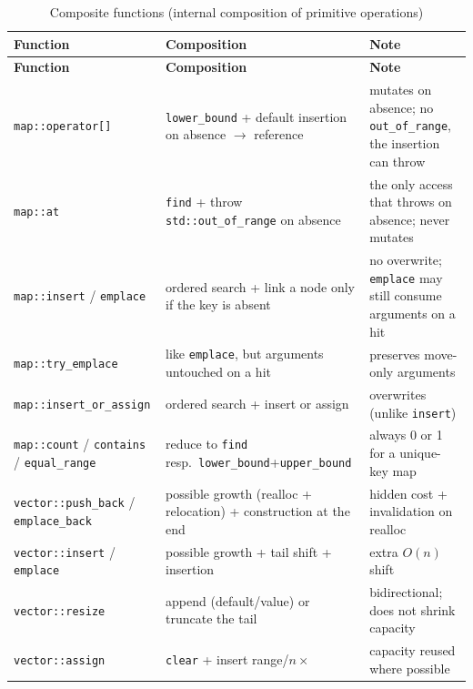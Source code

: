 \begin{longtable}{@{}>{\raggedright\arraybackslash}p{3.3cm} >{\raggedright\arraybackslash}p{5.6cm} >{\raggedright\arraybackslash}p{3.1cm}@{}}
  \caption{Composite functions (internal composition of primitive operations)}\label{tab:if-decomp}\\
  \toprule
  \textbf{Function} & \textbf{Composition} & \textbf{Note} \\
  \midrule
\endfirsthead%
  \toprule
  \textbf{Function} & \textbf{Composition} & \textbf{Note} \\
  \midrule
\endhead%
  \texttt{map::}\allowbreak\texttt{operator[]} & \texttt{lower\_bound} + default insertion on absence $\to$ reference & mutates on absence; no \texttt{out\_of\_range}, the insertion can throw \\
  \texttt{map::at} & \texttt{find} + throw \texttt{std::out\_of\_range} on absence & the only access that throws on absence; never mutates \\
  \texttt{map::insert} / \texttt{emplace} & ordered search + link a node only if the key is absent & no overwrite; \texttt{emplace} may still consume arguments on a hit \\
  \texttt{map::try\_\allowbreak{}emplace} & like \texttt{emplace}, but arguments untouched on a hit & preserves move-only arguments \\
  \texttt{map::insert\_\allowbreak{}or\_\allowbreak{}assign} & ordered search + insert or assign & overwrites (unlike \texttt{insert}) \\
  \texttt{map::count} / \texttt{contains} / \texttt{equal\_range} & reduce to \texttt{find} resp.\ \texttt{lower\_bound}+\texttt{upper\_bound} & always 0 or 1 for a unique-key map \\
  \texttt{vector::}\allowbreak\texttt{push\_back} / \texttt{emplace\_back} & possible growth (realloc + relocation) + construction at the end & hidden cost + invalidation on realloc \\
  \texttt{vector::insert} / \texttt{emplace} & possible growth + tail shift + insertion & extra $O(n)$ shift \\
  \texttt{vector::resize} & append (default/value) or truncate the tail & bidirectional; does not shrink capacity \\
  \texttt{vector::assign} & \texttt{clear} + insert range/$n\times$ & capacity reused where possible \\
  \bottomrule
\end{longtable}

